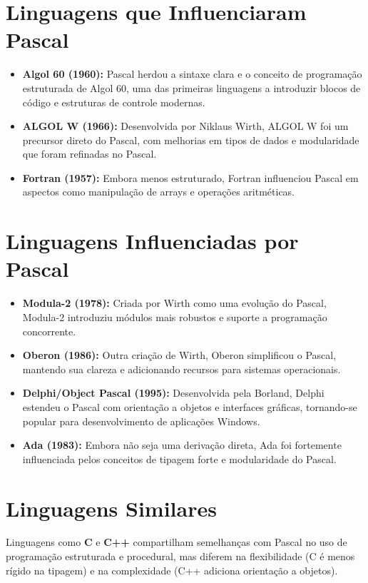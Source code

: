 \documentclass[12pt,a4paper,oneside]{abntex2}
\begin{document}
\section{Linguagens que Influenciaram Pascal}
\begin{itemize}
    \item \textbf{Algol 60 (1960):} Pascal herdou a sintaxe clara e o conceito de programação estruturada de Algol 60, uma das primeiras linguagens a introduzir blocos de código e estruturas de controle modernas.
    \item \textbf{ALGOL W (1966):} Desenvolvida por Niklaus Wirth, ALGOL W foi um precursor direto do Pascal, com melhorias em tipos de dados e modularidade que foram refinadas no Pascal.
    \item \textbf{Fortran (1957):} Embora menos estruturado, Fortran influenciou Pascal em aspectos como manipulação de arrays e operações aritméticas.
\end{itemize}

\section{Linguagens Influenciadas por Pascal}
\begin{itemize}
    \item \textbf{Modula-2 (1978):} Criada por Wirth como uma evolução do Pascal, Modula-2 introduziu módulos mais robustos e suporte a programação concorrente.
    \item \textbf{Oberon (1986):} Outra criação de Wirth, Oberon simplificou o Pascal, mantendo sua clareza e adicionando recursos para sistemas operacionais.
    \item \textbf{Delphi/Object Pascal (1995):} Desenvolvida pela Borland, Delphi estendeu o Pascal com orientação a objetos e interfaces gráficas, tornando-se popular para desenvolvimento de aplicações Windows.
    \item \textbf{Ada (1983):} Embora não seja uma derivação direta, Ada foi fortemente influenciada pelos conceitos de tipagem forte e modularidade do Pascal.
\end{itemize}

\section{Linguagens Similares}
Linguagens como \textbf{C} e \textbf{C++} compartilham semelhanças com Pascal no uso de programação estruturada e procedural, mas diferem na flexibilidade (C é menos rígido na tipagem) e na complexidade (C++ adiciona orientação a objetos).
\end{document}
